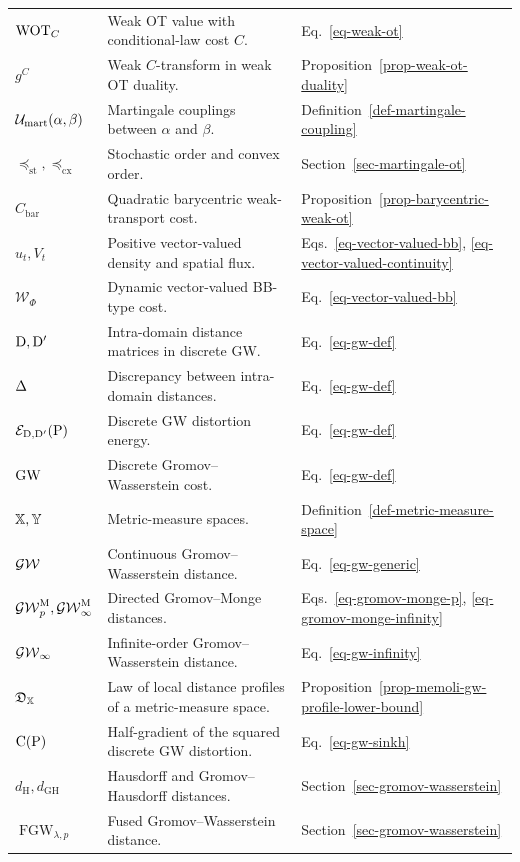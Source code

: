 {\begin{longtable}{>{\raggedright\arraybackslash}p{}
                  >{\raggedright\arraybackslash}p{}
                  >{\raggedright\arraybackslash}p{}}
$\operatorname{WOT}_C$ & Weak OT value with conditional-law cost $C$. & Eq.~\eqref{eq-weak-ot} \\
$g^C$ & Weak $C$-transform in weak OT duality. & Proposition~\ref{prop-weak-ot-duality} \\
$\mathcal{U}_{\mathrm{mart}}(\alpha,\beta)$ & Martingale couplings between $\alpha$ and $\beta$. & Definition~\ref{def-martingale-coupling} \\
$\preceq_{\mathrm{st}},\preceq_{\mathrm{cx}}$ & Stochastic order and convex order. & Section~\ref{sec-martingale-ot} \\
$C_{\mathrm{bar}}$ & Quadratic barycentric weak-transport cost. & Proposition~\ref{prop-barycentric-weak-ot} \\
$u_t,V_t$ & Positive vector-valued density and spatial flux. & Eqs.~\eqref{eq-vector-valued-bb}, \eqref{eq-vector-valued-continuity} \\
$\mathcal W_{\Phi}$ & Dynamic vector-valued BB-type cost. & Eq.~\eqref{eq-vector-valued-bb} \\
$\mathrm{D},\mathrm{D}'$ & Intra-domain distance matrices in discrete GW\@. & Eq.~\eqref{eq-gw-def} \\
$\Delta$ & Discrepancy between intra-domain distances. & Eq.~\eqref{eq-gw-def} \\
$\mathcal{E}_{\mathrm{D},\mathrm{D}'}(\mathrm{P})$ & Discrete GW distortion energy. & Eq.~\eqref{eq-gw-def} \\
$\operatorname{\mathrm{GW}}$ & Discrete Gromov--Wasserstein cost. & Eq.~\eqref{eq-gw-def} \\
$\mathbb{X},\mathbb{Y}$ & Metric-measure spaces. & Definition~\ref{def-metric-measure-space} \\
$\operatorname{\mathcal{GW}}$ & Continuous Gromov--Wasserstein distance. & Eq.~\eqref{eq-gw-generic} \\
$\operatorname{\mathcal{GW}}_p^{\mathrm M},\operatorname{\mathcal{GW}}_\infty^{\mathrm M}$ & Directed Gromov--Monge distances. & Eqs.~\eqref{eq-gromov-monge-p}, \eqref{eq-gromov-monge-infinity} \\
$\operatorname{\mathcal{GW}}_\infty$ & Infinite-order Gromov--Wasserstein distance. & Eq.~\eqref{eq-gw-infinity} \\
$\mathfrak D_{\mathbb{X}}$ & Law of local distance profiles of a metric-measure space. & Proposition~\ref{prop-memoli-gw-profile-lower-bound} \\
$\mathrm{C}(\mathrm{P})$ & Half-gradient of the squared discrete GW distortion. & Eq.~\eqref{eq-gw-sinkh} \\
$d_{\mathrm H},d_{\mathrm{GH}}$ & Hausdorff and Gromov--Hausdorff distances. & Section~\ref{sec-gromov-wasserstein} \\
$\operatorname{FGW}_{\lambda,p}$ & Fused Gromov--Wasserstein distance. & Section~\ref{sec-gromov-wasserstein} \\

\end{longtable}}
